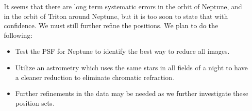 \documentclass[12pt,a4paper]{report}
\newcommand{\PE}{Perkin-Elmer }
\newcommand{\BC}{Boller \& Chivens }
\begin{document}


It seems that there are long term systematic errors in the orbit of Neptune, and in the orbit of Triton around Neptune, but it is too soon to state that with confidence. We must still further refine the positions. We plan to do the following:

\begin{itemize}
\item Test the PSF for Neptune to identify the best way to reduce all images.
\item Utilize an astrometry which uses the same stars in all fields of a night to have a cleaner reduction to eliminate chromatic refraction.
\item Further refinements in the data may be needed as we further investigate these position sets.
\end{itemize}


\end{document}
